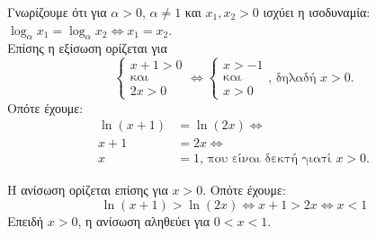 \begin{alist}
\item Γνωρίζουμε ότι για $\alpha > 0$, $\alpha \neq 1$ και $x_1, x_2 > 0$ ισχύει η ισοδυναμία: $\log_\alpha x_1 = \log_\alpha x_2 \Leftrightarrow x_1 = x_2$. \\
Επίσης η εξίσωση ορίζεται για
\[\begin{cases} x + 1 > 0 \\ \text{και} \\ 2x > 0 \end{cases} \Leftrightarrow \begin{cases} x > -1 \\ \text{και} \\ x > 0 \end{cases}\text{, δηλαδή } x > 0.\]
Οπότε έχουμε:
\begin{align*}
\ln(x + 1) &= \ln(2x) \Leftrightarrow \\
x + 1 &= 2x \Leftrightarrow \\
x &= 1\text{, που είναι δεκτή γιατί } x > 0.
\end{align*}
\item Η ανίσωση ορίζεται επίσης για $x > 0$. Οπότε έχουμε:
\[\ln(x + 1) > \ln(2x) \Leftrightarrow x + 1 > 2x \Leftrightarrow x < 1\]
Επειδή $x > 0$, η ανίσωση αληθεύει για $0 < x < 1$.
\end{alist}

